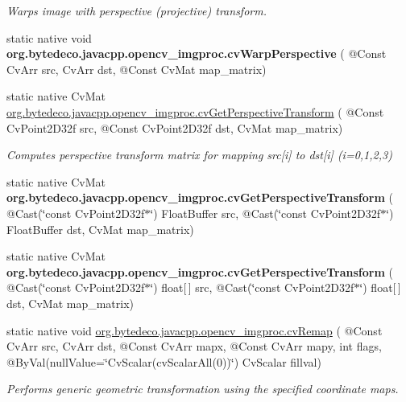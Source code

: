 \begin{DoxyCompactItemize}
\begin{DoxyCompactList}\small\item\em Warps image with perspective (projective) transform. \end{DoxyCompactList}\item 
\mbox{\label{group__imgproc__c_ga0576fadc77c24d2e5f937817bfbf9499}} 
static native void {\bfseries org.\+bytedeco.\+javacpp.\+opencv\+\_\+imgproc.\+cv\+Warp\+Perspective} ( @Const Cv\+Arr src, Cv\+Arr dst, @Const Cv\+Mat map\+\_\+matrix)
\item 
static native Cv\+Mat \hyperlink{group__imgproc__c_ga90db3b12f84ee1bea538d6d88bab49c3}{org.\+bytedeco.\+javacpp.\+opencv\+\_\+imgproc.\+cv\+Get\+Perspective\+Transform} ( @Const Cv\+Point2\+D32f src, @Const Cv\+Point2\+D32f dst, Cv\+Mat map\+\_\+matrix)
\begin{DoxyCompactList}\small\item\em Computes perspective transform matrix for mapping src\mbox{[}i\mbox{]} to dst\mbox{[}i\mbox{]} (i=0,1,2,3) \end{DoxyCompactList}\item 
\mbox{\label{group__imgproc__c_ga46316ab3856c74e0c6fe2d7f1a1c56cd}} 
static native Cv\+Mat {\bfseries org.\+bytedeco.\+javacpp.\+opencv\+\_\+imgproc.\+cv\+Get\+Perspective\+Transform} ( @Cast(\char`\"{}const Cv\+Point2\+D32f$\ast$\char`\"{}) Float\+Buffer src, @Cast(\char`\"{}const Cv\+Point2\+D32f$\ast$\char`\"{}) Float\+Buffer dst, Cv\+Mat map\+\_\+matrix)
\item 
\mbox{\label{group__imgproc__c_ga0dc4df2407276ef35a4ad606b1dac9f0}} 
static native Cv\+Mat {\bfseries org.\+bytedeco.\+javacpp.\+opencv\+\_\+imgproc.\+cv\+Get\+Perspective\+Transform} ( @Cast(\char`\"{}const Cv\+Point2\+D32f$\ast$\char`\"{}) float\mbox{[}$\,$\mbox{]} src, @Cast(\char`\"{}const Cv\+Point2\+D32f$\ast$\char`\"{}) float\mbox{[}$\,$\mbox{]} dst, Cv\+Mat map\+\_\+matrix)
\item 
static native void \hyperlink{group__imgproc__c_ga5fc4449699da7b00973991b5b610efbb}{org.\+bytedeco.\+javacpp.\+opencv\+\_\+imgproc.\+cv\+Remap} ( @Const Cv\+Arr src, Cv\+Arr dst, @Const Cv\+Arr mapx, @Const Cv\+Arr mapy, int flags, @By\+Val(null\+Value=\char`\"{}Cv\+Scalar(cv\+Scalar\+All(0))\char`\"{}) Cv\+Scalar fillval)
\begin{DoxyCompactList}\small\item\em Performs generic geometric transformation using the specified coordinate maps. \end{DoxyCompactList}\item 

\end{DoxyCompactItemize}
